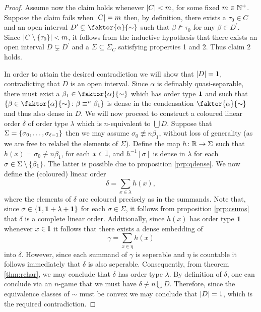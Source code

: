 \begin{proof}
	Assume now the claim holds whenever $\left\lvert C\right\rvert<m$, for some fixed $m\in\mathbb{N}^{+}$.  Suppose the claim fails when $\left\lvert C\right\rvert=m$ then, by definition, there exists a $\tau_0\in C$ and an open interval $D^\prime\subsetneq\faktor{\alpha}{\sim}$ such that $\beta\not\models\tau_0$ for any $\beta\in D^\prime$.  Since $\left\lvert C\setminus\left\lbrace \tau_0\right\rbrace\right\rvert<m$, it follows from the inductive hypothesis that there exists an open interval $D\subsetneq D^\prime$ and a $\Sigma\subseteq\Sigma_C$ satisfying properties 1 and 2.   Thus claim 2 holds.

	\smallskip	In order to attain the desired contradiction we will show that $\left\lvert D\right\rvert=1$, contradicting that $D$ is an open interval.  Since $\alpha$ is definably quasi-separable, there must exist a $\beta_1\in\faktor{\alpha}{\sim}$ which has order type $\mathbf{1}$ and such that $\setbuild{\beta\in\faktor{\alpha}{\sim}}{\beta\nequiv{n}\beta_1}$ is dense in the condensation $\faktor{\alpha}{\sim}$ and thus also dense in $D$.  We will now proceed to construct a coloured linear order $\delta$ of order type $\lambda$ which is $n$-equivalent to $\bigcup D$.  Suppose that $\Sigma=\left\lbrace \sigma_0,\dotsc,\sigma_{\ell-1}\right\rbrace$ then we may assume $\sigma_0\nequiv{n}\beta_1$, without loss of generality (as we are free to relabel the elements of $\Sigma$).  Define the map $h\colon\mathbb{R}\to\Sigma$ such that $h(x)=\sigma_0\nequiv{n}\beta_1$, for each $x\in\mathbb{I}$, and $h^{-1}[\sigma]$ is dense in $\lambda$ for each $\sigma\in\Sigma\setminus\left\lbrace \beta_1\right\rbrace$.  The latter is possible due to proposition \ref{prp:qdense}.  We now define the (coloured) linear order
	\begin{equation}
		\delta=\sum_{x\in\lambda}h(x),
	\end{equation}
	where the elements of $\delta$ are coloured precisely as in the summands.  Note that, since $\sigma\in\left\lbrace \mathbf{1},\mathbf{1}+\lambda+\mathbf{1}\right\rbrace$ for each $\sigma\in\Sigma$, it follows from proposition \ref{prp:csums} that $\delta$ is a complete linear order.  Additionally, since $h(x)$ has order type $\mathbf{1}$ whenever $x\in\mathbb{I}$ it follows that there exists a dense embedding of
	\begin{equation}
		\gamma=\sum_{x\in\eta}h(x)
	\end{equation}
	into $\delta$.  However, since each summand of $\gamma$ is seperable and $\eta$ is countable it follows immediately that $\delta$ is also seperable.  Consequently, from theorem \ref{thm:rchar}, we may conclude that $\delta$ has order type $\lambda$.  By definition of $\delta$, one can conclude via an $n$-game that we must have $\delta\nequiv{n}\bigcup D$.  Therefore, since the equivalence classes of $\sim$ must be convex we may conclude that $\left\lvert D\right\rvert=1$, which is the required contradiction.
\end{proof}
